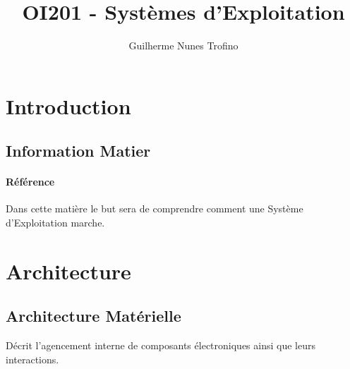 \documentclass{article}
\title{OI201 - Systèmes d'Exploitation}
\author{Guilherme Nunes Trofino}
\begin{document}
\maketitle


\newpage\tableofcontents

\section{Introduction}
% 
% 
% 



\subsection{Information Matier}
\paragraph{Référence}Dans cette matière le but sera de comprendre comment une Système d'Exploitation marche.

\section{Architecture}
\subsection{Architecture Matérielle}
\begin{definition}
    Décrit l'agencement interne de composants électroniques ainsi que leurs interactions.
\end{definition}
\end{document}
